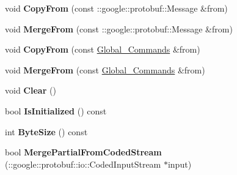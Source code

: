 \begin{DoxyCompactItemize}
\item 
void {\bfseries Copy\+From} (const \+::google\+::protobuf\+::\+Message \&from)\hypertarget{classvss__command_1_1Global__Commands_a4bd5bb12d6e5f08346704aa04a30fe57}{}\label{classvss__command_1_1Global__Commands_a4bd5bb12d6e5f08346704aa04a30fe57}

\item 
void {\bfseries Merge\+From} (const \+::google\+::protobuf\+::\+Message \&from)\hypertarget{classvss__command_1_1Global__Commands_a70b24974df993bc6cd742f074555544b}{}\label{classvss__command_1_1Global__Commands_a70b24974df993bc6cd742f074555544b}

\item 
void {\bfseries Copy\+From} (const \hyperlink{classvss__command_1_1Global__Commands}{Global\+\_\+\+Commands} \&from)\hypertarget{classvss__command_1_1Global__Commands_a2c2be618a14de139a996c3f40cdcaa7c}{}\label{classvss__command_1_1Global__Commands_a2c2be618a14de139a996c3f40cdcaa7c}

\item 
void {\bfseries Merge\+From} (const \hyperlink{classvss__command_1_1Global__Commands}{Global\+\_\+\+Commands} \&from)\hypertarget{classvss__command_1_1Global__Commands_a72522cd185ed392c8dba2b746f1c10be}{}\label{classvss__command_1_1Global__Commands_a72522cd185ed392c8dba2b746f1c10be}

\item 
void {\bfseries Clear} ()\hypertarget{classvss__command_1_1Global__Commands_a9027fa1a333a49d2a9e7927f1241d2d7}{}\label{classvss__command_1_1Global__Commands_a9027fa1a333a49d2a9e7927f1241d2d7}

\item 
bool {\bfseries Is\+Initialized} () const \hypertarget{classvss__command_1_1Global__Commands_ab59f63095dd243cd7311d9142a9326ef}{}\label{classvss__command_1_1Global__Commands_ab59f63095dd243cd7311d9142a9326ef}

\item 
int {\bfseries Byte\+Size} () const \hypertarget{classvss__command_1_1Global__Commands_a05036b0569ebf9d13ff9cee1430ffb12}{}\label{classvss__command_1_1Global__Commands_a05036b0569ebf9d13ff9cee1430ffb12}

\item 
bool {\bfseries Merge\+Partial\+From\+Coded\+Stream} (\+::google\+::protobuf\+::io\+::\+Coded\+Input\+Stream $\ast$input)\hypertarget{classvss__command_1_1Global__Commands_a0d0fcd0747bad0226fb5a0829f45ed1b}{}\label{classvss__command_1_1Global__Commands_a0d0fcd0747bad0226fb5a0829f45ed1b}


\end{DoxyCompactItemize}

